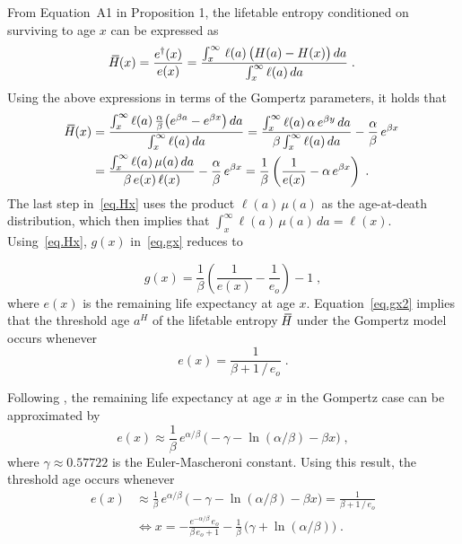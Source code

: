 \documentclass[a4paper,twoside, openright, 12pt, leqno]{article}
\newcommand*\xbar[1]{%
   \hbox{%
     \vbox{%
       \hrule height 0.5pt %
       \kern0.3ex%
       \hbox{%
         \kern-0.28em%
         \ensuremath{#1}%
         \kern-0.05em%
       }%
     }%
   }%
}
\begin{document}
From Equation~A1 in Proposition 1, the lifetable entropy conditioned on surviving to age $x$ can be expressed as
$$
\xbar{H}(x)=\frac{e^\dagger(x)}{e(x)}=\frac{\int_x^\infty\,\ell(a)\,\big(H(a)-H(x)\big)\,da}{\int_x^\infty\ell(a)\,da}\;.
$$
Using the above expressions in terms of the Gompertz parameters, it holds that
%
\begin{equation}
  \begin{split}
	\xbar{H}(x)
        & = \frac{\int_x^\infty \ell(a)\,\frac{\alpha}{\beta}\big(e^{\beta a}-e^{\beta x}\big)\,da}{\int_x^\infty\ell(a)\,da}=\frac{\int_x^\infty \ell(a)\,\alpha\,e^{\beta y}\,da}{\beta\int_x^\infty\ell(a)\,da} - \frac{\alpha}{\beta}\,e^{\beta x} 				\\
        & = \frac{\int_x^\infty\ell(a)\,\mu(a)\,da}{\beta\,e(x)\,\ell(x)} - \frac{\alpha}{\beta}\,e^{\beta x}=\frac{1}{\beta}\left(\frac{1}{e(x)}-\alpha\,e^{\beta x}\right)\;.
  \end{split}
  \label{eq.Hx}
\end{equation}
%
The last step in~\eqref{eq.Hx} uses the product $\ell(a)\,\mu(a)$ as the age-at-death distribution, which then implies that $\int_x^\infty \ell(a)\,\mu(a)\,da=\ell(x)$. Using~\eqref{eq.Hx}, $g(x)$ in~\eqref{eq.gx} reduces to

\begin{equation}
g(x) = \frac{1}{\beta}\left(\frac{1}{e(x)}-\frac{1}{e_o}\right)-1\;,
\label{eq.gx2}
\end{equation}
%
where $e(x)$ is the remaining life expectancy at age $x$. Equation~\eqref{eq.gx2} implies that the threshold age $a^H$ of the lifetable entropy $\,\xbar{H}$ under the Gompertz model occurs whenever
\begin{equation}
e(x) = \frac{1}{\beta+1\,/\,e_o}\;.
\label{eq.threshold}
\end{equation}

Following \citet{missov2013gompertz}, the remaining life expectancy at age $x$ in the Gompertz case can be approximated by
%
\begin{equation}
  e(x)\approx\frac{1}{\beta}\,e^{\alpha/\beta}\,\big(-\gamma-\ln(\alpha/\beta)-\beta x\big)\;,
  \label{eq:exapprox}
\end{equation}
%
where $\gamma\approx 0.57722$ is the Euler-Mascheroni constant. Using this result, the threshold age occurs whenever
%
\begin{equation*}
\begin{split}
e(x)	& \approx\frac{1}{\beta}\,e^{\alpha/\beta}\,\big(-\gamma-\ln(\alpha/\beta)-\beta x\big)=\frac{1}{\beta+1\,/\,e_o}			\\
& \Longleftrightarrow x=-\frac{e^{-\alpha/\beta}\,e_o}{\beta\,e_o+1}-\frac{1}{\beta}\,\big(\gamma+\ln(\alpha/\beta)\big)\;.
\end{split}
\end{equation*}
\end{document}
